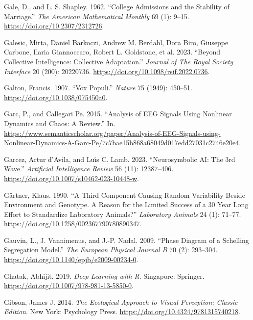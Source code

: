 \documentclass[
  a4paper,
  DIV=11,
  numbers=noendperiod,
  oneside]{scrreprt}
\newlength{\cslhangindent}
\newenvironment{CSLReferences}[2] %
 {\begin{list}{}{%
  \setlength{\itemindent}{0pt}
  \setlength{\leftmargin}{0pt}
  \setlength{\parsep}{0pt}
  \ifodd #1
   \setlength{\leftmargin}{\cslhangindent}
   \setlength{\itemindent}{-1\cslhangindent}
  \fi
  \setlength{\itemsep}{#2\baselineskip}}}
 {\end{list}}
\begin{document}
\begin{CSLReferences}{1}{0}
Gale, D., and L. S. Shapley. 1962. {``College {Admissions} and the
{Stability} of {Marriage}.''} \emph{The American Mathematical Monthly}
69 (1): 9--15. \url{https://doi.org/10.2307/2312726}.

Galesic, Mirta, Daniel Barkoczi, Andrew M. Berdahl, Dora Biro, Giuseppe
Carbone, Ilaria Giannoccaro, Robert L. Goldstone, et al. 2023. {``Beyond
Collective Intelligence: {Collective} Adaptation.''} \emph{Journal of
The Royal Society Interface} 20 (200): 20220736.
\url{https://doi.org/10.1098/rsif.2022.0736}.

Galton, Francis. 1907. {``Vox Populi.''} \emph{Nature} 75 (1949):
450--51. \url{https://doi.org/10.1038/075450a0}.

Garc, P., and Callegari Pe. 2015. {``Analysis of EEG Signals Using
Nonlinear Dynamics and Chaos: A Review.''} In.
\url{https://www.semanticscholar.org/paper/Analysis-of-EEG-Signals-using-Nonlinear-Dynamics-A-Garc-Pe/7c7bae15b868a68049d017edd27031c2746e20e4}.

Garcez, Artur d'Avila, and Luı́s C. Lamb. 2023. {``Neurosymbolic AI: The
3rd Wave.''} \emph{Artificial Intelligence Review} 56 (11): 12387--406.
\url{https://doi.org/10.1007/s10462-023-10448-w}.

Gärtner, Klaus. 1990. {``A Third Component Causing Random Variability
Beside Environment and Genotype. {A} Reason for the Limited Success of a
30 Year Long Effort to Standardize Laboratory Animals?''}
\emph{Laboratory Animals} 24 (1): 71--77.
\url{https://doi.org/10.1258/002367790780890347}.

Gauvin, L., J. Vannimenus, and J.-P. Nadal. 2009. {``Phase Diagram of a
{Schelling} Segregation Model.''} \emph{The European Physical Journal B}
70 (2): 293--304. \url{https://doi.org/10.1140/epjb/e2009-00234-0}.

Ghatak, Abhijit. 2019. \emph{Deep {Learning} with {R}}. {Singapore}:
{Springer}. \url{https://doi.org/10.1007/978-981-13-5850-0}.

Gibson, James J. 2014. \emph{The {Ecological Approach} to {Visual
Perception}: {Classic Edition}}. {New York}: {Psychology Press}.
\url{https://doi.org/10.4324/9781315740218}.


\end{CSLReferences}
\end{document}
